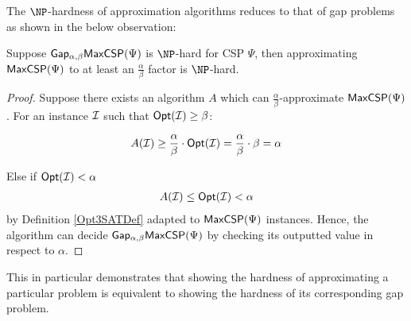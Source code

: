 The $\NP$-hardness of approximation algorithms reduces to that of gap problems as shown in the below observation:

\begin{theorem} \label{GapCSPtoAlgHard}
Suppose $\mathsf{Gap_{\alpha,\beta}}\mathsf{MaxCSP}(\Psi)$ is $\NP$-hard for CSP $\Psi$, then approximating $\mathsf{MaxCSP}(\Psi)$ to at least an $\frac{\alpha}{\beta}$ factor is $\NP$-hard.
\end{theorem}
%
\begin{proof}
Suppose there exists an algorithm $A$ which can $\frac{\alpha}{\beta}$-approximate $\mathsf{MaxCSP}(\Psi)$. For an instance $\mathcal{I}$ such that $\mathsf{Opt}(\mathcal{I}) \geq \beta$:

\begin{gather*}
A(\mathcal{I}) \geq  \frac{\alpha}{\beta} \cdot \mathsf{Opt}(\mathcal{I}) = \frac{\alpha}{\beta} \cdot \beta =  \alpha \\
\end{gather*}

Else if $\mathsf{Opt}(\mathcal{I}) < \alpha$
\begin{gather*}
A(\mathcal{I}) \leq \mathsf{Opt}(\mathcal{I}) < \alpha
\end{gather*}
by Definition \ref{Opt3SATDef} adapted to $\mathsf{MaxCSP}(\Psi)$ instances. Hence, the algorithm can decide  $\mathsf{Gap_{\alpha,\beta}}\mathsf{MaxCSP}(\Psi)$ by checking its outputted value in respect to $\alpha$.
\end{proof}
%
This in particular demonstrates that showing the hardness of approximating a particular problem is equivalent to showing the hardness of its corresponding gap problem.



